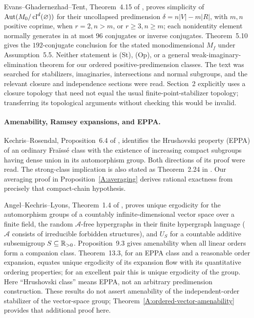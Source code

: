 Evans--Ghadernezhad--Tent, Theorem~4.15 of
\cite{ABEvansGhadernezhadTent2016}, proves simplicity of
$\operatorname{Aut}(M_0/\operatorname{cl}^d(\varnothing))$ for their uncollapsed
predimension $\delta=n|V|-m|R|$, with $m,n$ positive coprime,
when $r=2,n>m$, or $r\ge3,n\ge m$; each nonidentity element normally
generates in at most $96$ conjugates or inverse conjugates.
Theorem~5.10 gives the $192$-conjugate conclusion for the stated
monodimensional $M_f$ under Assumption~5.5. Neither statement is
(St), (Op), or a general weak-imaginary-elimination theorem for our
ordered positive-predimension classes. The text was searched for
stabilizers, imaginaries, intersections and normal subgroups, and
the relevant closure and independence sections were read. Section~2
explicitly uses a closure topology that need not equal the usual
finite-point-stabilizer topology; transferring its topological
arguments without checking this would be invalid.

\paragraph{Amenability, Ramsey expansions, and EPPA.}
Kechris--Rosendal, Proposition~6.4 of \cite{ABKechrisRosendal2007},
identifies the Hrushovski property (EPPA) of an ordinary Fra\"iss\'e
class with the existence of increasing compact subgroups having
dense union in its automorphism group. Both directions of its
proof were read. The strong-class implication is also stated as
Theorem~2.24 in \cite{ABEHN2019}. Our averaging proof in
Proposition~\ref{A:averaging} derives rational exactness from precisely
that compact-chain hypothesis.

Angel--Kechris--Lyons, Theorem~1.4 of \cite{ABAngelKechrisLyons2014},
proves unique ergodicity for the automorphism groups of a countably
infinite-dimensional vector space over a finite field, the random
$\mathcal A$-free hypergraphs in their finite hypergraph language
($\mathcal A$ consists of irreducible forbidden structures), and
$U_S$ for a countable additive subsemigroup $S\subseteq\mathbb R_{>0}$.
Proposition~9.3 gives amenability when all linear orders form a
companion class. Theorem~13.3, for an EPPA class and a reasonable
order expansion, equates unique ergodicity of its expansion flow
with its quantitative ordering properties; for an excellent pair
this is unique ergodicity of the group. Here ``Hrushovski class''
means EPPA, not an arbitrary predimension construction. These
results do not assert amenability of the independent-order
stabilizer of the vector-space group; Theorem~\ref{A:ordered-vector-amenability}
provides that additional proof here.

